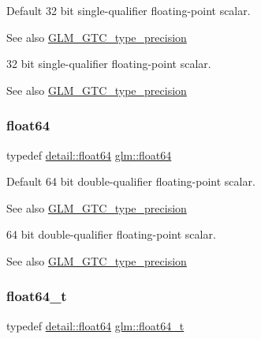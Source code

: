 Default 32 bit single-\/qualifier floating-\/point scalar. \begin{DoxySeeAlso}{See also}
\mbox{\hyperlink{group__gtc__type__precision}{G\+L\+M\+\_\+\+G\+T\+C\+\_\+type\+\_\+precision}}
\end{DoxySeeAlso}
32 bit single-\/qualifier floating-\/point scalar. \begin{DoxySeeAlso}{See also}
\mbox{\hyperlink{group__gtc__type__precision}{G\+L\+M\+\_\+\+G\+T\+C\+\_\+type\+\_\+precision}} 
\end{DoxySeeAlso}
\mbox{\label{group__gtc__type__precision_gab721f828b41f46b20cf4883b50733d3b}} 
\subsubsection{\texorpdfstring{float64}{float64}}
{\footnotesize\ttfamily typedef \mbox{\hyperlink{namespaceglm_1_1detail_a5a0a9a1be3fd5dbe6d47ae45c3022b06}{detail\+::float64}} \mbox{\hyperlink{group__gtc__type__precision_gab721f828b41f46b20cf4883b50733d3b}{glm\+::float64}}}

Default 64 bit double-\/qualifier floating-\/point scalar. \begin{DoxySeeAlso}{See also}
\mbox{\hyperlink{group__gtc__type__precision}{G\+L\+M\+\_\+\+G\+T\+C\+\_\+type\+\_\+precision}}
\end{DoxySeeAlso}
64 bit double-\/qualifier floating-\/point scalar. \begin{DoxySeeAlso}{See also}
\mbox{\hyperlink{group__gtc__type__precision}{G\+L\+M\+\_\+\+G\+T\+C\+\_\+type\+\_\+precision}} 
\end{DoxySeeAlso}
\mbox{\label{group__gtc__type__precision_gade966a3eb25ebeb16dd53c40d3fdeb46}} 
\subsubsection{\texorpdfstring{float64\+\_\+t}{float64\_t}}
{\footnotesize\ttfamily typedef \mbox{\hyperlink{namespaceglm_1_1detail_a5a0a9a1be3fd5dbe6d47ae45c3022b06}{detail\+::float64}} \mbox{\hyperlink{group__gtc__type__precision_gade966a3eb25ebeb16dd53c40d3fdeb46}{glm\+::float64\+\_\+t}}}

